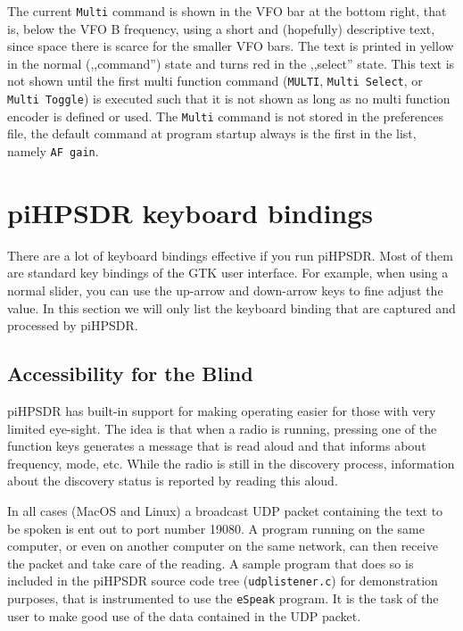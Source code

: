 \documentclass[12pt]{book}
\def\bltt#1{\texttt{\color{blue}#1}}
\def\pH{pi\-HPSDR\xspace}
\begin{document}
The current \bltt{Multi} command is shown in the VFO bar at the bottom right, that is, below
the VFO B frequency, using a short and (hopefully) descriptive text, since space there is
scarce for the smaller VFO bars. The text is printed in yellow in the normal (,,command'') state and
turns red in the ,,select'' state. This text is not shown until the first multi function command
(\bltt{MULTI}, \bltt{Multi Select}, or \bltt{Multi Toggle}) is executed such that it is not
shown as long as no multi function encoder is defined or used. The \bltt{Multi} command is not
stored in the preferences file, the default command at program startup always is the first in the list,
namely \bltt{AF gain}.
\chapter[Keyboard bindings]{\pH keyboard bindings}

There are a lot of keyboard bindings effective if you run \pH. Most of them are
standard key bindings of the GTK user interface. For example, when using a normal
slider, you can use the up-arrow and down-arrow keys to fine adjust the value. In this
section we will only list the keyboard binding that are captured and processed by \pH.

\section{Accessibility for the Blind}
\label{sec:accessibility}
\pH has built-in support for making operating easier for those with very limited
eye-sight. The idea is that when a radio is running, pressing one of the function keys generates
a message that
is read aloud and that informs about frequency, mode, etc. While the radio is still in the
discovery process, information about the discovery status is reported by reading this aloud.

In all cases (MacOS and Linux) a broadcast UDP packet containing the text to be spoken
is ent out to port number 19080. A program running on the same computer, or even on another
computer on the same network, can
then receive the packet and take care of the reading. A sample program that does so
is included in the \pH source code tree (\texttt{udplistener.c}) for demonstration purposes,
that is instrumented to use  the \texttt{eSpeak} program. It is the task of the user to
make good use of the data contained in the UDP packet.
\end{document}
